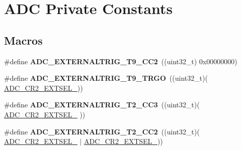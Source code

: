 \hypertarget{group___a_d_c___private___constants}{\section{A\-D\-C Private Constants}
\label{group___a_d_c___private___constants}
}
\subsection*{Macros}
\begin{DoxyCompactItemize}
\item 
\hypertarget{group___a_d_c___private___constants_ga0bdb9643a56b2c580160a4b2898d7366}{\#define {\bfseries A\-D\-C\-\_\-\-E\-X\-T\-E\-R\-N\-A\-L\-T\-R\-I\-G\-\_\-\-T9\-\_\-\-C\-C2}~((uint32\-\_\-t) 0x00000000)}\label{group___a_d_c___private___constants_ga0bdb9643a56b2c580160a4b2898d7366}

\item 
\hypertarget{group___a_d_c___private___constants_gab1a079b90c7dc0e4228b3fb5125bbdb2}{\#define {\bfseries A\-D\-C\-\_\-\-E\-X\-T\-E\-R\-N\-A\-L\-T\-R\-I\-G\-\_\-\-T9\-\_\-\-T\-R\-G\-O}~((uint32\-\_\-t)(                                                         \hyperlink{group___peripheral___registers___bits___definition_ga9410c7fd93f6d0b157ede745ee269d7b}{A\-D\-C\-\_\-\-C\-R2\-\_\-\-E\-X\-T\-S\-E\-L\-\_}))}\label{group___a_d_c___private___constants_gab1a079b90c7dc0e4228b3fb5125bbdb2}

\item 
\hypertarget{group___a_d_c___private___constants_gaa6959386f4e60347d920cb5412843f50}{\#define {\bfseries A\-D\-C\-\_\-\-E\-X\-T\-E\-R\-N\-A\-L\-T\-R\-I\-G\-\_\-\-T2\-\_\-\-C\-C3}~((uint32\-\_\-t)(                                      \hyperlink{group___peripheral___registers___bits___definition_ga5a6725419743a8d01b4a223609952893}{A\-D\-C\-\_\-\-C\-R2\-\_\-\-E\-X\-T\-S\-E\-L\-\_}                   ))}\label{group___a_d_c___private___constants_gaa6959386f4e60347d920cb5412843f50}

\item 
\hypertarget{group___a_d_c___private___constants_gac6dc356899afe00c76d354cfea4ecfda}{\#define {\bfseries A\-D\-C\-\_\-\-E\-X\-T\-E\-R\-N\-A\-L\-T\-R\-I\-G\-\_\-\-T2\-\_\-\-C\-C2}~((uint32\-\_\-t)(                                      \hyperlink{group___peripheral___registers___bits___definition_ga5a6725419743a8d01b4a223609952893}{A\-D\-C\-\_\-\-C\-R2\-\_\-\-E\-X\-T\-S\-E\-L\-\_} $\vert$ \hyperlink{group___peripheral___registers___bits___definition_ga9410c7fd93f6d0b157ede745ee269d7b}{A\-D\-C\-\_\-\-C\-R2\-\_\-\-E\-X\-T\-S\-E\-L\-\_}))}\label{group___a_d_c___private___constants_gac6dc356899afe00c76d354cfea4ecfda}


\end{DoxyCompactItemize}
